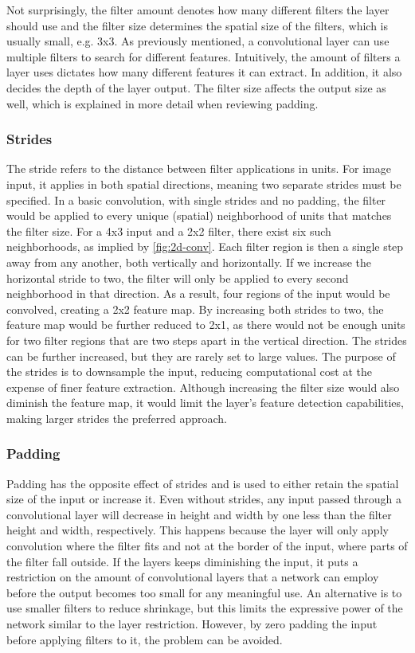 Not surprisingly, the filter amount denotes how many different filters the layer should use and the filter size determines the spatial size of the filters, which is usually small, e.g. 3x3. As previously mentioned, a convolutional layer can use multiple filters to search for different features. Intuitively, the amount of filters a layer uses dictates how many different features it can extract. In addition, it also decides the depth of the layer output. The filter size affects the output size as well, which is explained in more detail when reviewing padding.

\subsubsection{Strides}

The stride refers to the distance between filter applications in units. For image input, it applies in both spatial directions, meaning two separate strides must be specified. In a basic convolution, with single strides and no padding, the filter would be applied to every unique (spatial) neighborhood of units that matches the filter size. For a 4x3 input and a 2x2 filter, there exist six such neighborhoods, as implied by \autoref{fig:2d-conv}. Each filter region is then a single step away from any another, both vertically and horizontally. If we increase the horizontal stride to two, the filter will only be applied to every second neighborhood in that direction. As a result, four regions of the input would be convolved, creating a 2x2 feature map. By increasing both strides to two, the feature map would be further reduced to 2x1, as there would not be enough units for two filter regions that are two steps apart in the vertical direction. The strides can be further increased, but they are rarely set to large values. The purpose of the strides is to downsample the input, reducing computational cost at the expense of finer feature extraction. Although increasing the filter size would also diminish the feature map, it would limit the layer's feature detection capabilities, making larger strides the preferred approach.

\subsubsection{Padding}

Padding has the opposite effect of strides and is used to either retain the spatial size of the input or increase it. Even without strides, any input passed through a convolutional layer will decrease in height and width by one less than the filter height and width, respectively. This happens because the layer will only apply convolution where the filter fits and not at the border of the input, where parts of the filter fall outside. If the layers keeps diminishing the input, it puts a restriction on the amount of convolutional layers that a network can employ before the output becomes too small for any meaningful use. An alternative is to use smaller filters to reduce shrinkage, but this limits the expressive power of the network similar to the layer restriction. However, by zero padding the input before applying filters to it, the problem can be avoided. \\

